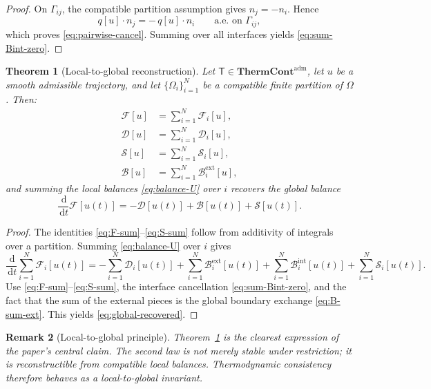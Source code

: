 \documentclass[10pt,a4paper]{amsart}
\newtheorem{theorem}{Theorem}[section]
\newtheorem{remark}[theorem]{Remark}
\newcommand{\Om}{\Omega}
\newcommand{\dd}{\,\mathrm{d}}
\newcommand{\F}{\mathcal{F}}
\newcommand{\Diss}{\mathcal{D}}
\newcommand{\Bnd}{\mathcal{B}}
\newcommand{\Src}{\mathcal{S}}
\newcommand{\ThermAdm}{\mathbf{ThermCont}^{\mathrm{adm}}}
\begin{document}
\begin{proof}
On \(\Gamma_{ij}\), the compatible partition assumption gives \(n_j=-n_i\). Hence
\[
q[u]\cdot n_j = -\,q[u]\cdot n_i
\qquad \text{a.e. on }\Gamma_{ij},
\]
which proves \eqref{eq:pairwise-cancel}. Summing over all interfaces yields
\eqref{eq:sum-Bint-zero}.
\end{proof}

\begin{theorem}[Local-to-global reconstruction]\label{thm:local-to-global}
Let \(\mathsf{T}\in\ThermAdm\), let \(u\) be a smooth admissible trajectory, and let
\(\{\Om_i\}_{i=1}^N\) be a compatible finite partition of \(\Om\). Then:
\begin{align}
\F[u] &= \sum_{i=1}^N \F_i[u],\label{eq:F-sum}\\
\Diss[u] &= \sum_{i=1}^N \Diss_i[u],\label{eq:D-sum}\\
\Src[u] &= \sum_{i=1}^N \Src_i[u],\label{eq:S-sum}\\
\Bnd[u] &= \sum_{i=1}^N \Bnd_i^{\mathrm{ext}}[u],\label{eq:B-sum-ext}
\end{align}
and summing the local balances \eqref{eq:balance-U} over \(i\) recovers the global
balance
\begin{equation}\label{eq:global-recovered}
\frac{\dd}{\dd t}\F[u(t)]
=
-\Diss[u(t)] + \Bnd[u(t)] + \Src[u(t)].
\end{equation}
\end{theorem}

\begin{proof}
The identities \eqref{eq:F-sum}--\eqref{eq:S-sum} follow from additivity of
integrals over a partition. Summing \eqref{eq:balance-U} over \(i\) gives
\[
\frac{\dd}{\dd t}\sum_{i=1}^N \F_i[u(t)]
=
-\sum_{i=1}^N \Diss_i[u(t)]
+\sum_{i=1}^N \Bnd_i^{\mathrm{ext}}[u(t)]
+\sum_{i=1}^N \Bnd_i^{\mathrm{int}}[u(t)]
+\sum_{i=1}^N \Src_i[u(t)].
\]
Use \eqref{eq:F-sum}--\eqref{eq:S-sum}, the interface cancellation
\eqref{eq:sum-Bint-zero}, and the fact that the sum of the external pieces is the
global boundary exchange \eqref{eq:B-sum-ext}. This yields
\eqref{eq:global-recovered}.
\end{proof}

\begin{remark}[Local-to-global principle]
Theorem~\ref{thm:local-to-global} is the clearest expression of the paper's central
claim. The second law is not merely stable under restriction; it is reconstructible
from compatible local balances. Thermodynamic consistency therefore behaves as a
local-to-global invariant.
\end{remark}
\end{document}
